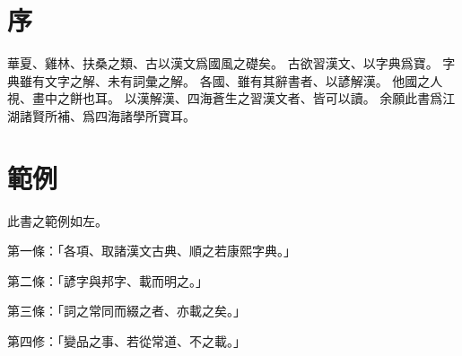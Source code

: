\section{序}
華夏、雞林、扶桑之類、古以漢文爲國風之礎矣。
古欲習漢文、以字典爲寶。
字典雖有文字之解、未有詞彙之解。
各國、雖有其辭書者、以諺解漢。
他國之人視、畫中之餅也耳。
以漢解漢、四海蒼生之習漢文者、皆可以讀。
余願此書爲江湖諸賢所補、爲四海諸學所寶耳。
\section{範例}
此書之範例如左。
\par 第一條：「各項、取諸漢文古典、順之若康熙字典。」
\par 第二條：「諺字與邦字、載而明之。」
\par 第三條：「詞之常同而綴之者、亦載之矣。」
\par 第四修：「變品之事、若從常道、不之載。」
